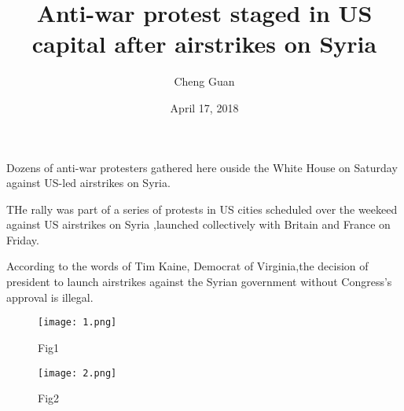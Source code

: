 \documentclass[UTF8]{article}
\author{Cheng Guan}
\title{Anti-war protest staged in US capital after airstrikes on Syria}
\date{April 17, 2018}
\begin{document}
\maketitle

  Dozens of anti-war protesters gathered here ouside the White House on Saturday
against US-led airstrikes on Syria.

  THe rally was part of a series of protests in US cities scheduled over the
weekeed against US airstrikes on Syria ,launched  collectively with Britain
and France on Friday.

  According to the words of Tim Kaine, Democrat of Virginia,the decision of
president to launch airstrikes against the Syrian government without Congress's
approval is illegal.

\begin{figure}[htbp]
\centering
\begin{minipage}[t]{0.48\textwidth}
\centering
\texttt{[image: 1.png]}
\caption{Fig1} \label{Fig1}
\end{minipage}
\begin{minipage}[t]{0.48\textwidth}
\centering
\texttt{[image: 2.png]}
\caption{Fig2} \label{Fig2}
\end{minipage}
\end{figure}
\end{document}
